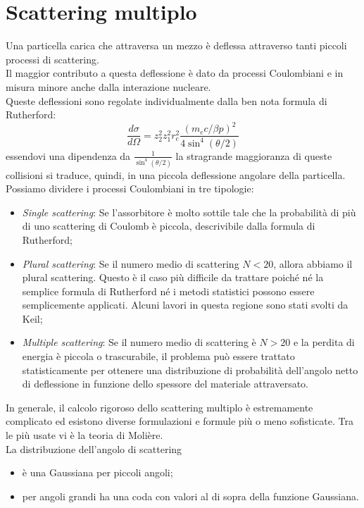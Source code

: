 \documentclass[12pt, letterpaper]{book}
\begin{document}
\section{Scattering multiplo}
Una particella carica che attraversa un mezzo è deflessa attraverso tanti piccoli processi di scattering.\\
Il maggior contributo a questa deflessione è dato da processi Coulombiani e in misura minore anche dalla interazione nucleare.\\
Queste deflessioni sono regolate individualmente dalla ben nota formula di Rutherford:
$$\frac{d\sigma}{d\Omega}=z_2^2z^2_1r_e^2 \frac{(m_e c/\beta p)^2}{4\sin^4(\theta/2)}$$
essendovi una dipendenza da $\frac{1}{\sin^4(\theta/2)}$ la stragrande maggioranza di queste collisioni si traduce, quindi, in una piccola deflessione angolare della particella.\\
Possiamo dividere i processi Coulombiani in tre tipologie:
\begin{itemize}
    \item \textit{Single scattering}: Se l'assorbitore è molto sottile tale che la probabilità di più di uno scattering di Coulomb è piccola, descrivibile dalla formula di Rutherford;
    \item \textit{Plural scattering}: Se il numero medio di scattering $N < 20$, allora abbiamo il plural scattering. Questo è il caso più difficile da trattare poiché né la semplice formula di Rutherford né i metodi statistici possono essere semplicemente applicati. Alcuni lavori in questa regione sono stati svolti da Keil;
    \item \textit{Multiple scattering}: Se il numero medio di scattering è $N > 20$ e la perdita di energia è piccola o trascurabile, il problema può essere trattato statisticamente per ottenere una distribuzione di probabilità dell'angolo netto di deflessione in funzione dello spessore del materiale attraversato. 
\end{itemize}
In generale, il calcolo rigoroso dello scattering multiplo è estremamente complicato ed esistono diverse formulazioni e formule più o meno sofisticate.
Tra le più usate vi è la teoria di Molière.\\La distribuzione dell'angolo di scattering
\begin{itemize}
    \item è una Gaussiana per piccoli angoli;
    \item per angoli grandi ha una coda con valori al di sopra della funzione Gaussiana.
\end{itemize}
\end{document}
